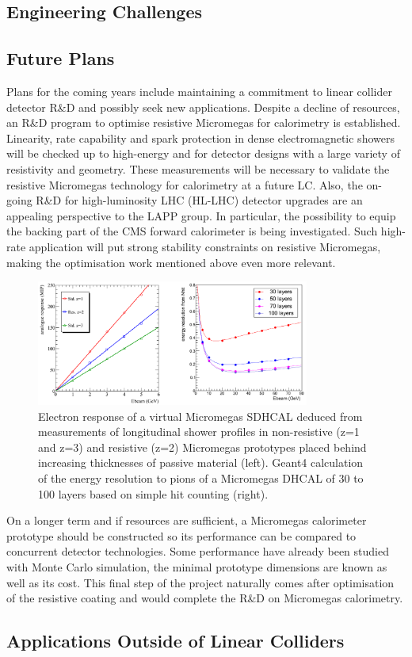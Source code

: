 \subsection{Engineering Challenges}

\subsection{Future Plans}
Plans for the coming years include maintaining a commitment to linear collider detector R\&D and possibly seek new applications. Despite a decline of resources, an R\&D program to optimise resistive Micromegas for calorimetry is established. Linearity, rate capability and spark protection in dense electromagnetic showers will be checked up to high-energy and for detector designs with a large variety of resistivity and geometry. These measurements will be necessary to validate the resistive Micromegas technology for calorimetry at a future LC. Also, the on-going R\&D for high-luminosity LHC (HL-LHC) detector upgrades are an appealing perspective to the LAPP group. In particular, the possibility to equip the backing part of the CMS forward calorimeter is being investigated. Such high-rate application will put strong stability constraints on resistive Micromegas, making the optimisation work mentioned above even more relevant.

\begin{figure}
\begin{centering}
\includegraphics[width=0.8\textwidth]{Calorimeter/SDHCAL/test2}
\caption{Electron response of a virtual Micromegas SDHCAL deduced from measurements of longitudinal shower profiles in non-resistive (z=1 and z=3) and resistive (z=2) Micromegas prototypes placed behind increasing thicknesses of passive material (left). Geant4 calculation of the energy resolution to pions of a Micromegas DHCAL of 30 to 100 layers based on simple hit counting (right).}
\label{future}
\end{centering}
\end{figure}

On a longer term and if resources are sufficient, a Micromegas calorimeter prototype should be constructed so its performance can be compared to concurrent detector technologies. Some performance have already been studied with Monte Carlo simulation, the minimal prototype dimensions are known as well as its cost. This final step of the project naturally comes after optimisation of the resistive coating and would complete the R\&D on Micromegas calorimetry.

\subsection{Applications Outside of Linear Colliders}
